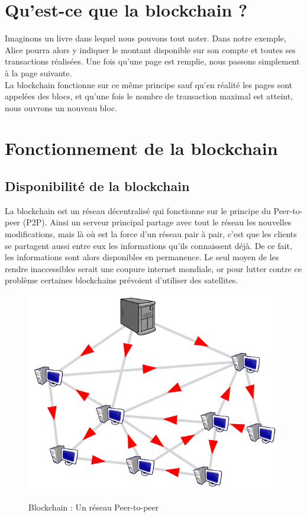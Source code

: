 \documentclass[12pt, a4paper, oneside]{book}
\begin{document}
    \section{Qu'est-ce que la blockchain ?}
    Imaginons un livre dans lequel nous pouvons tout noter. Dans notre exemple, Alice pourra alors y indiquer le montant disponible sur son compte et toutes ses transactions réalisées. Une fois qu’une page est remplie, nous passons simplement à la page suivante.
    \\
    La blockchain fonctionne sur ce même principe sauf qu’en réalité les pages sont appelées des blocs, et qu’une fois le nombre de transaction maximal est atteint, nous ouvrons un nouveau bloc.

    \section{Fonctionnement de la blockchain}
    
    \subsection{Disponibilité de la blockchain}
    La blockchain est un réseau décentralisé qui fonctionne sur le principe du Peer-to-peer (P2P). 
    Ainsi un serveur principal partage avec tout le réseau les nouvelles modifications, mais là où est la force d'un réseau pair à pair, c'est que les clients se partagent aussi 
    entre eux les informations qu'ils connaissent déjà. De ce fait, les informations sont alors disponibles en permanence. Le seul moyen de les rendre inaccessibles serait une 
    coupure internet mondiale, or pour lutter contre ce problème certaines blockchains prévoient d'utiliser des satellites.
    
    \begin{figure}[H]
        \begin{center}
          \includegraphics[width=.69\textwidth]{images/peerToPeer.png}
          \label{fig:peerToPeer}
          \caption{Blockchain : Un réseau Peer-to-peer}
        \end{center}
    \end{figure}
\end{document}
